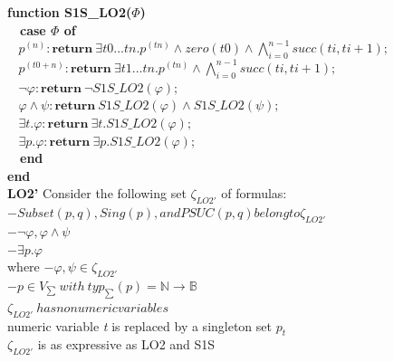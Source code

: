 \documentclass{article}
\begin{document}
\begin{multicols}{4}
\textbf{function S1S\_LO2($\Phi$)} \\
\ \ \textbf{case $\Phi$ of} \\
$\ \ \ \ p^{(n)} : \textbf{return}\ \exists t0...tn. p^{(tn)} \wedge zero(t0) \wedge \bigwedge_{i=0}^{n-1} succ(ti, ti + 1); $ \\
$\ \ \ \ p^{(t0 + n)} : \textbf{return}\ \exists t1...tn. p^{(tn)} \wedge \bigwedge_{i=0}^{n-1} succ(ti, ti + 1); $ \\
$\ \ \ \ \neg \varphi : \textbf{return}\ \neg S1S\_LO2(\varphi); $ \\
$\ \ \ \ \varphi \wedge \psi : \textbf{return}\ S1S\_LO2(\varphi) \wedge S1S\_LO2(\psi); $ \\
$\ \ \ \ \exists t.\varphi : \textbf{return}\ \exists t.S1S\_LO2(\varphi);$ \\
$\ \ \ \ \exists p.\varphi : \textbf{return}\ \exists p.S1S\_LO2(\varphi); $ \\
\ \ \textbf{end} \\
\textbf{end} \\

\textbf{LO2'}
Consider the following set $\zeta_{LO2'}$ of formulas: \\
$-Subset(p,q), Sing(p), and PSUC(p,q) belong to \zeta_{LO2'}$ \\
$-\neg\varphi, \varphi \wedge \psi $ \\
$-\exists p.\varphi$ \\
where
$-\varphi, \psi \in \zeta_{LO2'}$ \\
$-p \in V_{\sum}\ with\ typ_{\sum}(p) = \mathbb{N} \rightarrow \mathbb{B}$ \\
$\zeta_{LO2'}\ has no numeric variables$ \\
numeric variable \textit{t} is replaced by a singleton set $p_{t}$ \\
$\zeta_{LO2'}$ is as expressive as LO2 and S1S \\


\end{multicols}
\end{document}
